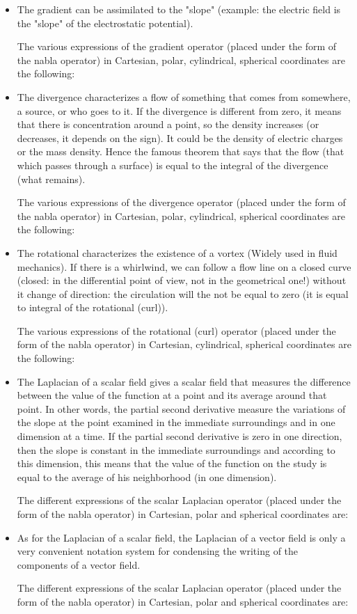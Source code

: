 	\begin{itemize}
		\item The gradient can be assimilated to the "slope" (example: the electric field is the "slope" of the electrostatic potential).
		
		The various expressions of the gradient operator (placed under the form of the nabla operator) in Cartesian, polar, cylindrical, spherical coordinates are the following:
		
		
		\item The divergence characterizes a flow of something that comes from somewhere, a source, or who goes to it. If the divergence is different from zero, it means that there is concentration around a point, so the density increases (or decreases, it depends on the sign). It could be the density of electric charges or the mass density. Hence the famous theorem that says that the flow (that which passes through a surface) is equal to the integral of the divergence (what remains).
		
		The various expressions of the divergence operator (placed under the form of the nabla operator) in Cartesian, polar, cylindrical, spherical coordinates are the following:
		
		
		\item The rotational characterizes the existence of a vortex (Widely used in fluid mechanics). If there is a whirlwind, we can follow a flow line on a closed curve (closed: in the differential point of view, not in the geometrical one!) without it change of direction: the circulation will the not be equal to zero (it is equal to integral of the rotational (curl)).
		
		The various expressions of the rotational (curl) operator (placed under the form of the nabla operator) in Cartesian, cylindrical, spherical coordinates are the following:
		
		
		\item The Laplacian of a scalar field gives a scalar field that measures the difference between the value of the function at a point and its average around that point. In other words, the partial second derivative measure the variations of the slope at the point examined in the immediate surroundings and in one dimension at a time. If the partial second derivative is zero in one direction, then the slope is constant in the immediate surroundings and according to this dimension, this means that the value of the function on the study is equal to the average of his neighborhood (in one dimension).
		
		The different expressions of the scalar Laplacian operator (placed under the form of the nabla operator) in Cartesian, polar and spherical coordinates are:
		
		
		\item As for the Laplacian of a scalar field, the Laplacian of a vector field is only a very convenient notation system for condensing the writing of the components of a vector field.
		
		The different expressions of the scalar Laplacian operator (placed under the form of the nabla operator) in Cartesian, polar and spherical coordinates are:
		
	\end{itemize}
